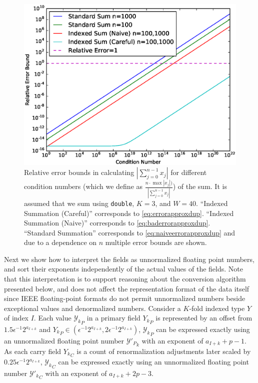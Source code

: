 \begin{figure}[H]
\begin{center}
\includegraphics[width=\textwidth]{plots/error_comparison}
\caption{Relative error bounds in calculating $|\sum \limits_{j = 0}^{n - 1}
x_j|$ for different condition numbers (which we define as $\frac{n \cdot \max
|x_j|)}{|\sum \limits_{j = 0}^{n - 1} x_j|}$) of the sum. It is assumed that we
sum using \texttt{double}, $K = 3$, and $W = 40$. ``Indexed Summation
(Careful)'' corresponds to \eqref{eq:errorapproxdup}. ``Indexed Summation
(Naive)'' corresponds to \eqref{eq:baderrorapproxdup}. ``Standard Summation''
corresponds to \eqref{eq:naiveerrorapproxdup} and due to a dependence on $n$
multiple error bounds are shown.}
\label{fig:conversionmotivation}
\end{center}
\end{figure}

    Next we show how to interpret the fields as unnormalized floating point numbers,
    and sort their exponents independently of the actual values of the fields.
    Note that this interpretation is to support reasoning about the conversion algorithm
    presented below, and does not affect the representation format of the data itself
    since IEEE floating-point formats do not permit unnormalized numbers
    beside exceptional values and denormalized numbers.
    Consider a $K$-fold indexed type $Y$ of index $I$.
    Each value ${\mathcal{Y}_k}_P$ in a primary field ${Y_k}_P$ is represented by an offset from $1.5  \epsilon^{-1}  2^{a_{I + k}}$ and ${Y_k}_P \in (\epsilon^{-1}  2^{a_{I + k}}, 2  \epsilon^{-1}  2^{a_{I + k}})$, ${\mathcal{Y}_k}_P$ can be expressed exactly using an unnormalized floating point number ${\mathcal{Y}'_P}_k$ with an exponent of $a_{I + k} + p - 1$.
    As each carry field ${Y_k}_C$ is a count of renormalization adjustments later scaled by $0.25  \epsilon^{-1}  2^{a_{I + k}}$, ${\mathcal{Y}_k}_C$ can be expressed exactly using an unnormalized floating point number ${\mathcal{Y}'_k}_C$ with an exponent of $a_{I + k} + 2  p - 3$.

